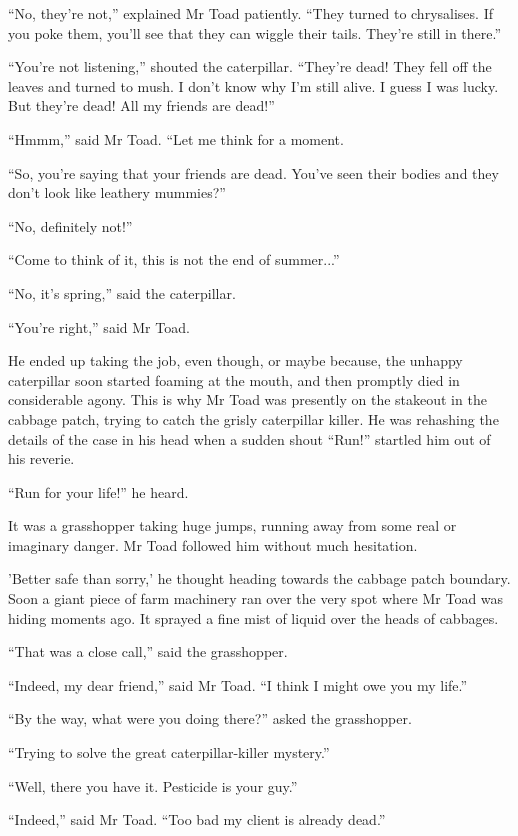 \documentclass{memoir}
\begin{document}
``No, they're not,'' explained Mr Toad patiently. ``They turned to chrysalises. If you poke them, you'll see that they can wiggle their tails. They're still in there.''

``You're not listening,'' shouted the caterpillar. ``They're dead! They fell off the leaves and turned to mush. I don't know why I'm still alive. I guess I was lucky. But they're dead! All my friends are dead!''

``Hmmm,'' said Mr Toad. ``Let me think for a moment.

``So, you're saying that your friends are dead. You've seen their bodies and they don't look like leathery mummies?''

``No, definitely not!'' 

``Come to think of it, this is not the end of summer...''

``No, it's spring,'' said the caterpillar. 

``You're right,'' said Mr Toad.

He ended up taking the job, even though, or maybe because, the unhappy caterpillar soon started foaming at the mouth, and then promptly died in considerable agony. This is why Mr Toad was presently on the stakeout in the cabbage patch, trying to catch the grisly caterpillar killer. He was rehashing the details of the case in his head when a sudden shout ``Run!'' startled him out of his reverie. 

``Run for your life!'' he heard.

It was a grasshopper taking huge jumps, running away from some real or imaginary danger. Mr Toad followed him without much hesitation. 

'Better safe than sorry,' he thought heading towards the cabbage patch boundary. Soon a giant piece of farm machinery ran over the very spot where Mr Toad was hiding moments ago. It sprayed a fine mist of liquid over the heads of cabbages.

``That was a close call,'' said the grasshopper. 

``Indeed, my dear friend,'' said Mr Toad. ``I think I might owe you my life.''

``By the way, what were you doing there?'' asked the grasshopper.

``Trying to solve the great caterpillar-killer mystery.''

``Well, there you have it. Pesticide is your guy.''

``Indeed,'' said Mr Toad. ``Too bad my client is already dead.''
\end{document}
